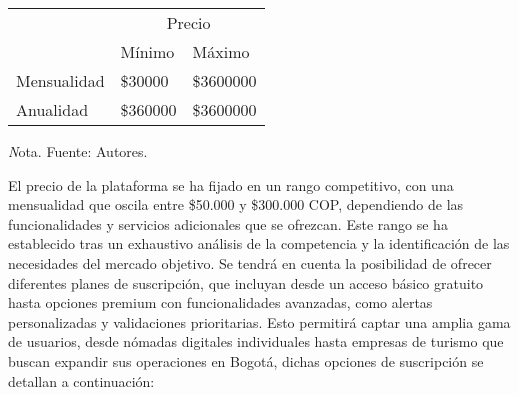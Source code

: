 \begin{adjustbox}{
            center,
            caption=[{Precio en el mercado actual}]{\centering Precio en el mercado actual (Valores en pesos colombianos COP). },
            label={Precio},
            nofloat=table, vspace={20px}}
            {
       \begin{threeparttable}
           \begin{tabular}{|p{11cm}|p{10cm}p{2cm}|}
                \hline
                \rowcolor[HTML]{D9EAD3} 
                \cellcolor[HTML]{D9EAD3}                              & \multicolumn{2}{c|}{\cellcolor[HTML]{D9EAD3}Precio}            \\ \cline{2-3} 
                \rowcolor[HTML]{D9EAD3} 
                 \multirow{-2}{*}{\cellcolor[HTML]{D9EAD3}Suscripción} & \multicolumn{1}{l|}{\cellcolor[HTML]{D9EAD3}Mínimo} & Máximo   \\ \hline
                                \multicolumn{1}{|l|}{Mensualidad}                     & \multicolumn{1}{l|}{\$30000}                       & \$3600000 \\ \hline
                                \multicolumn{1}{|l|}{Anualidad}                       & \multicolumn{1}{l|}{\$360000}                      & \$3600000 \\ \hline      \end{tabular}
            \begin{tablenotes}
                \vspace{2mm}
               \textit Nota. Fuente: Autores.
            \end{tablenotes}
            
        \end{threeparttable}
    }

\end{adjustbox}

El precio de la plataforma se ha fijado en un rango competitivo, con una mensualidad que oscila entre \$50.000 y \$300.000 COP, dependiendo de las funcionalidades y servicios adicionales que se ofrezcan. Este rango se ha establecido tras un exhaustivo análisis de la competencia y la identificación de las necesidades del mercado objetivo.
Se tendrá en cuenta la posibilidad de ofrecer diferentes planes de suscripción, que incluyan desde un acceso básico gratuito hasta opciones premium con funcionalidades avanzadas, como alertas personalizadas y validaciones prioritarias. Esto permitirá captar una amplia gama de usuarios, desde nómadas digitales individuales hasta empresas de turismo que buscan expandir sus operaciones en Bogotá, dichas opciones de suscripción se detallan a continuación:


